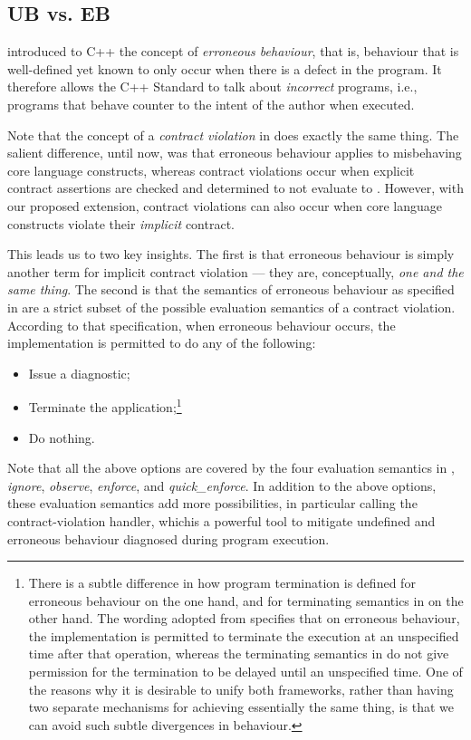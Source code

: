 \subsection{UB vs. EB}
\label{erroneous}

\cite{P2795R5} introduced to C++ the concept of \emph{erroneous behaviour}, that is, behaviour that is well-defined yet known to only occur when there is a defect in the program. It therefore allows the C++ Standard to talk about \emph{incorrect} programs, i.e., programs that behave counter to the intent of the author when executed.

Note that the concept of a \emph{contract violation} in \cite{P2900R8} does exactly the same thing. The salient difference, until now, was that erroneous behaviour applies to misbehaving core language constructs, whereas contract violations occur when  explicit contract assertions are checked and determined to not evaluate to . However, with our proposed extension, contract violations can also occur when core language constructs violate their \emph{implicit} contract. 

This leads us to two key insights. The first is that erroneous behaviour is simply another term for implicit contract violation --- they are, conceptually, \emph{one and the same thing}. The second is that the semantics of erroneous behaviour as specified in \cite{P2795R5} are a strict subset of the possible evaluation semantics of a contract violation. According to that specification, when erroneous behaviour occurs, the implementation is permitted to do any of the following:
\begin{itemize}
\item Issue a diagnostic;
\item Terminate the application;\footnote{There is a subtle difference in how program termination is defined for erroneous behaviour on the one hand, and for terminating semantics in \cite{P2900R8} on the other hand. The wording adopted from \cite{P2795R5} specifies that on erroneous behaviour, the implementation is permitted to terminate the execution at an unspecified time after that operation, whereas the terminating semantics in \cite{P2900R8} do not give permission for the termination to be delayed until an unspecified time. One of the reasons why it is desirable to unify both frameworks, rather than having two separate mechanisms for achieving essentially the same thing, is that we can avoid such subtle divergences in behaviour.}
\item Do nothing.
\end{itemize}
Note that all the above options are covered by the four evaluation semantics in \cite{P2900R8}, \emph{ignore}, \emph{observe}, \emph{enforce}, and \emph{quick_enforce}. In addition to the above options, these evaluation semantics add more possibilities, in particular calling the contract-violation handler, whichis a powerful tool to mitigate undefined and erroneous behaviour diagnosed during program execution.

